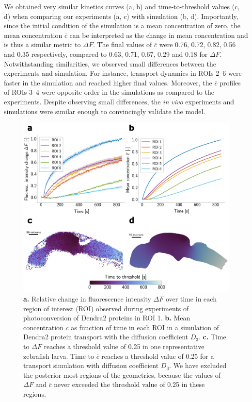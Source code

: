 \documentclass[fleqn]{wlscirep}
\newcommand{\cbar}{\overline{c}}
\begin{document}
We obtained very similar kinetics curves (a, b)
and time-to-threshold values (c, d) when comparing our
experiments (a, c) with
simulation (b, d).
Importantly, since the initial condition of the simulation is a mean concentration of zero,
the mean concentration $\cbar$ can be interpreted as the change in mean concentration and
is thus a similar metric to $\Delta F$.
The final values of $\cbar$ were 0.76, 0.72, 0.82, 0.56 and 0.35 respectively,
compared to 0.63, 0.71, 0.67, 0.29 and 0.18 for $\Delta F$.
Notwithstanding similarities, we observed small differences between the experiments and simulation.
For instance, transport dynamics in ROIs 2--6 were faster in the simulation and reached higher final values.
Moreover, the $\cbar$ profiles of ROIs 3--4 were opposite order in
the simulations as compared to the experiments.
Despite observing small differences, the \emph{in vivo} experiments and
simulations were similar enough to convincingly validate the model.
\begin{figure}[H]
    \centering
    \includegraphics[width=\textwidth]{graphics/figure3_compare_experiments_and_simulations.png}
    \caption{\textbf{a.} Relative change in fluorescence intensity $\Delta F$ over time
    in each region of interest (ROI)
    observed during experiments of photoconversion of Dendra2 proteins in ROI 1.
    \textbf{b.} Mean concentration $\cbar$ as function of time in each ROI in a
    simulation of Dendra2 protein transport with
    the diffusion coefficient $D_3$.
    \textbf{c.} Time to $\Delta F$ reaches a threshold value of 0.25 in
    one representative zebrafish larva.
    Time to $\cbar$ reaches a threshold value of 0.25 for
    a transport simulation with diffusion coefficient $D_3$.
    We have excluded the posterior-most regions of the geometries,
    because the values of $\Delta F$ and $\cbar$ never exceeded the threshold
    value of 0.25 in these regions.}
    \label{fig:figure3_compare_exp_and_sim_control}
\end{figure}
\end{document}
